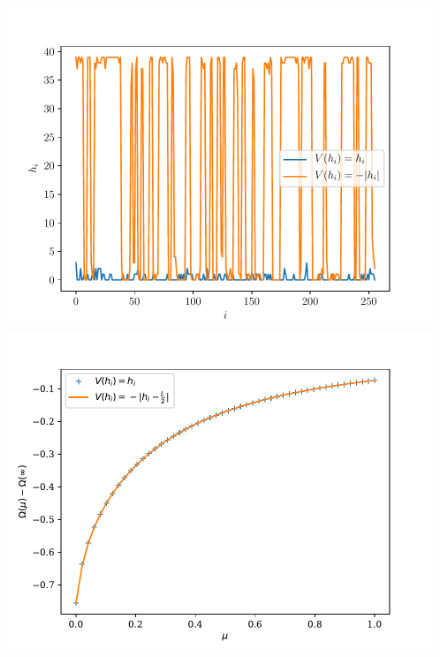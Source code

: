 \begin{figure}
	\begin{minipage}[t]{0.4\linewidth}
		\includegraphics[width=\linewidth]{chap4/comp-potentiels-chimiques.pdf}
	\end{minipage}%
	\begin{minipage}[t]{0.4\linewidth}
		\includegraphics[width=\linewidth]{chap4/free-ene-potentiels.pdf}
	\end{minipage}
	\centering
	\begin{minipage}{0.4\linewidth}

\end{minipage}
\end{figure}
